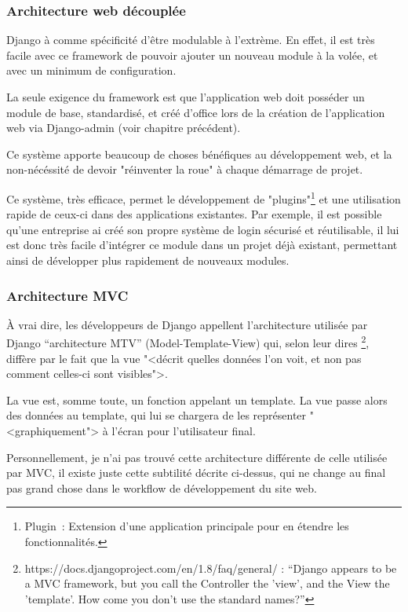 \documentclass[12pt,table,a4paper]{report}
\begin{document}
\subsubsection{Architecture web découplée}
Django à comme spécificité d'être modulable à l'extrème. En effet, il est très facile avec ce framework de pouvoir ajouter un nouveau module à la volée, et avec un minimum de configuration.

La seule exigence du framework est que l'application web doit posséder un module de base, standardisé, et créé d'office lors de la création de l'application web via Django-admin (voir chapitre précédent).

Ce système apporte beaucoup de choses bénéfiques au développement web, et la non-nécéssité de devoir "réinventer la roue" à chaque démarrage de projet.

Ce système, très efficace, permet le développement de "plugins"\footnote{Plugin : Extension d'une application principale pour en étendre les fonctionnalités.} et une utilisation rapide de ceux-ci dans des applications existantes.
Par exemple, il est possible qu'une entreprise ai créé son propre système de login sécurisé et réutilisable, il lui est donc très facile d'intégrer ce module dans un projet déjà existant, permettant ainsi de développer plus rapidement de nouveaux modules.

\subsubsection{Architecture MVC}
À vrai dire, les développeurs de Django appellent l'architecture utilisée par Django "`architecture MTV"' (Model-Template-View) qui, selon leur dires \footnote{https://docs.djangoproject.com/en/1.8/faq/general/ : "`Django appears to be a MVC framework, but you call the Controller the 'view', and the View the 'template'. How come you don’t use the standard names?"'}, diffère par le fait que la vue "<décrit quelles données l'on voit, et non pas comment celles-ci sont visibles">.

La vue est, somme toute, un fonction appelant un template. La vue passe alors des données au template, qui lui se chargera de les représenter "<graphiquement"> à l'écran pour l'utilisateur final.

Personnellement, je n'ai pas trouvé cette architecture différente de celle utilisée par MVC, il existe juste cette subtilité décrite ci-dessus, qui ne change au final pas grand chose dans le workflow de développement du site web.
\end{document}
